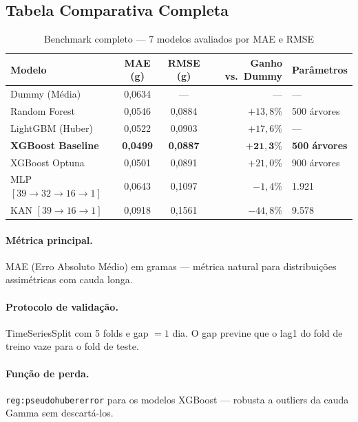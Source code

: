 \documentclass[12pt, a4paper]{article}
\begin{document}
\subsection{Tabela Comparativa Completa}

\begin{table}[H]
\centering
\caption{Benchmark completo --- 7 modelos avaliados por MAE e RMSE}
\label{tab:benchmark}
\begin{tabular}{@{}lS[table-format=1.4]S[table-format=1.4]rl@{}}
\toprule
\textbf{Modelo} &
    {\textbf{MAE (g)}} &
    {\textbf{RMSE (g)}} &
    \textbf{Ganho vs.\ Dummy} &
    \textbf{Parâmetros} \\
\midrule
Dummy (Média) &
    0,0634 & {---} & {---} & {---} \\
Random Forest &
    0,0546 & 0,0884 & $+13{,}8\%$ & 500 árvores \\
LightGBM (Huber) &
    0,0522 & 0,0903 & $+17{,}6\%$ & {---} \\
\textbf{XGBoost Baseline} &
    \textbf{0,0499} & \textbf{0,0887} &
    $\boldsymbol{+21{,}3\%}$ & \textbf{500 árvores} \\
XGBoost Optuna &
    0,0501 & 0,0891 & $+21{,}0\%$ & 900 árvores \\
MLP $[39 \to 32 \to 16 \to 1]$ &
    0,0643 & 0,1097 & $-1{,}4\%$ & 1.921 \\
KAN $[39 \to 16 \to 1]$ &
    0,0918 & 0,1561 & $-44{,}8\%$ & 9.578 \\
\bottomrule
\end{tabular}
\end{table}

\paragraph{Métrica principal.} MAE (Erro Absoluto Médio) em gramas ---
métrica natural para distribuições assimétricas com cauda longa.

\paragraph{Protocolo de validação.} TimeSeriesSplit com 5 folds e
gap $= 1$ dia. O gap previne que o lag1 do fold de treino vaze para
o fold de teste.

\paragraph{Função de perda.} \texttt{reg:pseudohubererror} para os
modelos XGBoost --- robusta a outliers da cauda Gamma sem descartá-los.
\end{document}
